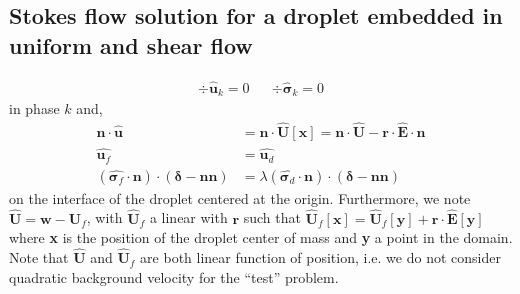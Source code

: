\subsection{Stokes flow solution for a droplet embedded in uniform and shear flow}
\begin{align}
    \div \hat{\textbf{u}}_k = 0 
    && \div \hat{\bm\sigma}_k = 0 
    \label{eq:test_sol}
\end{align}
in phase $k$ and, 
\begin{align}    
    \textbf{n}\cdot \hat{\textbf{u}} &=  \textbf{n}\cdot \hat{\textbf{U}}[\textbf{x}] = \textbf{n}\cdot \hat{\textbf{U}} - \textbf{r}\cdot \hat{\textbf{E}} \cdot \textbf{n}\\
    \hat{\textbf{u}_f} &= \hat{\textbf{u}_d}\\
    (\hat{\bm\sigma_f}\cdot \textbf{n}) \cdot (\bm\delta - \textbf{nn})
    &= 
    \lambda (\hat{\bm\sigma_d}\cdot \textbf{n}) \cdot (\bm\delta - \textbf{nn}) \label{eq:bc_stress}
\end{align} 
on the interface of the droplet centered at the origin. 
Furthermore, we note $\hat{\textbf{U}} = \textbf{w} - \hat{\textbf{U}}_f$, with $\hat{\textbf{U}}_f$ a linear with $\textbf{r}$ such that $ \hat{\textbf{U}}_f[\textbf{x}] = \hat{\textbf{U}}_f[\textbf{y}]+\textbf{r}\cdot \hat{\textbf{E}}[\textbf{y}]$  where \textbf{x} is the position of the droplet center of mass and \textbf{y} a point in the domain.
Note that $\hat{\textbf{U}}$ and $\hat{\textbf{U}}_f$ are both linear function of position, i.e. we do not consider quadratic background velocity for the ``test''  problem. 

